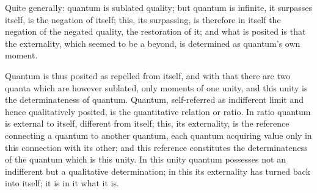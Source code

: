 Quite generally: quantum is sublated quality;
but quantum is infinite, it surpasses itself,
is the negation of itself;
this, its surpassing, is therefore in itself
the negation of the negated quality,
the restoration of it;
and what is posited is that the externality,
which seemed to be a beyond,
is determined as quantum's own moment.

Quantum is thus posited as repelled from itself,
and with that there are two quanta which are however sublated,
only moments of one unity,
and this unity is the determinateness of quantum.
Quantum, self-referred as
indifferent limit and hence qualitatively posited,
is the quantitative relation or ratio.
In ratio quantum is external to itself, different from itself;
this, its externality, is the reference
connecting a quantum to another quantum,
each quantum acquiring value only
in this connection with its other;
and this reference constitutes the determinateness
of the quantum which is this unity.
In this unity quantum possesses not an indifferent
but a qualitative determination;
in this its externality has turned back into itself;
it is in it what it is.
